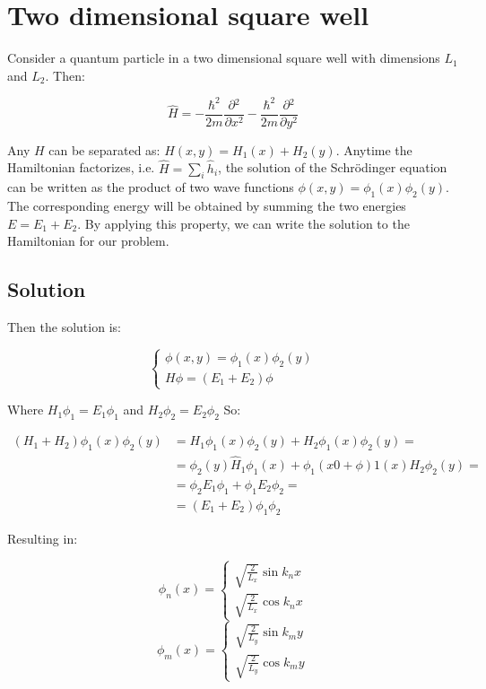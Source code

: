 \section{Two dimensional square well}
Consider a quantum particle in a two dimensional square well with dimensions $L_1$ and $L_2$.
Then:

$$\hat{H} = -\frac{\hbar^2}{2m}\frac{\partial {^2}}{\partial {x^2}}-\frac{\hbar^2}{2m}\frac{\partial {^2}}{\partial {y^2}}$$

Any $H$ can be separated as: $H(x,y) = H_1(x) + H_2(y)$.
Anytime the Hamiltonian factorizes, i.e. $\hat{H}=\sum_i{\hat{h}_i}$, the solution of the Schr\"odinger equation can be written as the product of two wave functions $\phi(x,y)=\phi_1(x)\phi_2(y)$.
The corresponding energy will be obtained by summing the two energies $E=E_1+E_2$.
By applying this property, we can write the solution to the Hamiltonian for our problem.

  \subsection{Solution}
  Then the solution is:

  $$\begin{cases}\phi(x,y) = \phi_1(x)\phi_2(y)\\H\phi=(E_1+E_2)\phi\end{cases}$$

  Where $H_1\phi_1 = E_1\phi_1$  and $H_2\phi_2 = E_2\phi_2$
  So:

  \begin{align*}
    (H_1 + H_2)\phi_1(x)\phi_2(y) &= H_1\phi_1(x)\phi_2(y) + H_2\phi_1(x)\phi_2(y)=\\
                                  &= \phi_2(y)\hat{H}_1\phi_1(x)+\phi_1(x0+\phi)1(x)H_2\phi_2(y)=\\
                                  &= \phi_2 E_1\phi_1 + \phi_1E_2\phi_2=\\
                                  &=(E_1+E_2)\phi_1\phi_2
  \end{align*}

 Resulting in:

  $$\phi_n(x) = \begin{cases}\sqrt{\frac{2}{L_{x}}} \sin k_n x\\ \sqrt{\frac{2}{L_{x}}} \cos k_n x\end{cases}$$
  $$\phi_m(x) = \begin{cases}\sqrt{\frac{2}{L_{y}}} \sin k_m y\\ \sqrt{\frac{2}{L_{y}}} \cos k_m y\end{cases}$$

